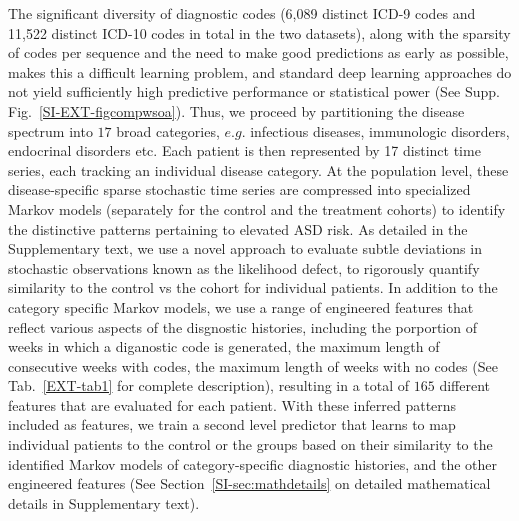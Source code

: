 \documentclass[3p,super,numbers,sort&compress,10pt]{elsarticle}
\begin{document}
The significant diversity of diagnostic codes (6,089 distinct ICD-9 codes and 11,522 distinct ICD-10 codes in total in the two datasets), along with the sparsity of codes per sequence and the need to make good predictions as early as possible,  makes this a difficult learning problem, and standard deep learning approaches do not yield sufficiently high predictive performance or statistical power (See Supp. Fig.~\ref{SI-EXT-figcompwsoa}). Thus, we proceed by  partitioning the  disease spectrum into $17 $ broad categories, $e.g.$ infectious diseases, immunologic disorders, endocrinal disorders etc. Each patient is then represented by 17 distinct time series, each  tracking an individual disease category. At the population level, these disease-specific sparse stochastic time series are  compressed into specialized Markov models (separately for the control and the treatment cohorts) to identify  the distinctive patterns  pertaining to elevated ASD risk. As detailed in the Supplementary text, we use a novel approach to evaluate subtle deviations in stochastic observations known as the likelihood defect, to rigorously quantify similarity to the control vs the \treatment cohort for individual patients.   In addition to the category specific Markov models, we use a range of engineered features that reflect various aspects of the disgnostic histories, including the porportion of weeks in which a diganostic code is generated, the maximum length of consecutive weeks with codes, the maximum length of weeks with no codes (See Tab.~\ref{EXT-tab1} for complete description), resulting in a total of $165$ different features that are evaluated for each patient. With these inferred patterns included as features,  we train a second level predictor that learns to map   individual patients  to the control or the \treatment groups based on their  similarity  to the identified  Markov models of category-specific diagnostic histories, and the other engineered features (See Section~\ref{SI-sec:mathdetails} on detailed mathematical details  in Supplementary  text). %
\end{document}
